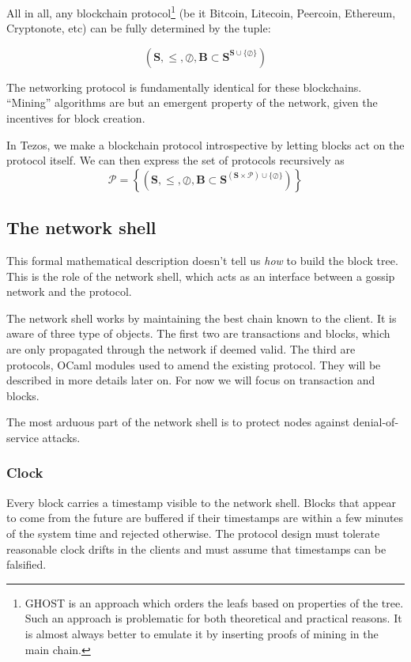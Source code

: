 \documentclass[letterpaper]{article}
\begin{document}
All in all, any blockchain protocol\footnote{GHOST is an approach which orders
the leafs based on properties of the tree. Such an approach is problematic for
both theoretical and practical reasons. It is almost always better to emulate it
by inserting proofs of mining in the main chain.} (be it Bitcoin, Litecoin,
Peercoin, Ethereum, Cryptonote, etc) can be fully determined by the tuple:

$$\left(\mathbf{S},\leq,\oslash,
\mathbf{B} \subset \mathbf{S}^{\mathbf{S} \cup \{\oslash\}}\right)$$

The networking protocol is fundamentally identical for these blockchains.
``Mining'' algorithms are but an emergent property of the network,
given the incentives for block creation.

In Tezos, we make a blockchain protocol introspective 
by letting blocks act on the protocol itself.
We can then express the set of protocols recursively as
$$\mathcal{P} = \left\{\left(\mathbf{S},\leq,\oslash,\mathbf{B} \subset
\mathbf{S}^{(\mathbf{S} \times \mathcal{P})\cup \{\oslash\}} \right)\right\}$$


\subsection{The network shell}
This formal mathematical description doesn't tell us \emph{how} to build the
block tree. This is the role of the network shell, which acts as an interface
between a gossip network and the protocol.

The network shell works by maintaining the best chain known to the client. It is
aware of three type of objects. The first two are transactions and blocks, which
are only propagated through the network if deemed valid. The third are
protocols, OCaml modules used to amend the existing protocol. They will be
described in more details later on. For now we will focus on transaction and
blocks.

The most arduous part of the network shell is to protect nodes against
denial-of-service attacks.

\subsubsection{Clock}
Every block carries a timestamp visible to the network shell. Blocks that appear
to come from the future are buffered if their timestamps are within a few
minutes of the system time and rejected otherwise. The protocol design must
tolerate reasonable clock drifts in the clients and must assume that timestamps
can be falsified.
\end{document}
